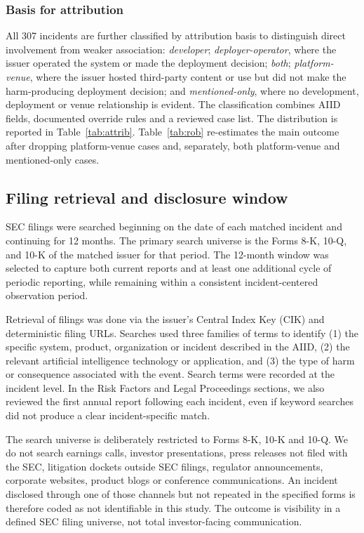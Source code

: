 \documentclass[utf8]{FrontiersinHarvard}
\begin{document}
\subsubsection{Basis for attribution}\label{sec:attrib}
All 307 incidents are further classified by attribution basis to distinguish direct involvement from weaker association: \emph{developer}; \emph{deployer-operator}, where the issuer operated the system or made the deployment decision; \emph{both}; \emph{platform-venue}, where the issuer hosted third-party content or use but did not make the harm-producing deployment decision; and \emph{mentioned-only}, where no development, deployment or venue relationship is evident. The classification combines AIID fields, documented override rules and a reviewed case list. The distribution is reported in Table~\ref{tab:attrib}. Table~\ref{tab:rob} re-estimates the main outcome after dropping platform-venue cases and, separately, both platform-venue and mentioned-only cases.

\subsection{Filing retrieval and disclosure window}\label{sec:filings}
SEC filings were searched beginning on the date of each matched incident and continuing for 12 months. The primary search universe is the Forms 8-K, 10-Q, and 10-K of the matched issuer for that period. The 12-month window was selected to capture both current reports and at least one additional cycle of periodic reporting, while remaining within a consistent incident-centered observation period.

Retrieval of filings was done via the issuer's Central Index Key (CIK) and deterministic filing URLs. Searches used three families of terms to identify (1) the specific system, product, organization or incident described in the AIID, (2) the relevant artificial intelligence technology or application, and (3) the type of harm or consequence associated with the event. Search terms were recorded at the incident level. In the Risk Factors and Legal Proceedings sections, we also reviewed the first annual report following each incident, even if keyword searches did not produce a clear incident-specific match.

The search universe is deliberately restricted to Forms 8-K, 10-K and 10-Q. We do not search earnings calls, investor presentations, press releases not filed with the SEC, litigation dockets outside SEC filings, regulator announcements, corporate websites, product blogs or conference communications. An incident disclosed through one of those channels but not repeated in the specified forms is therefore coded as not identifiable in this study. The outcome is visibility in a defined SEC filing universe, not total investor-facing communication.
\end{document}
